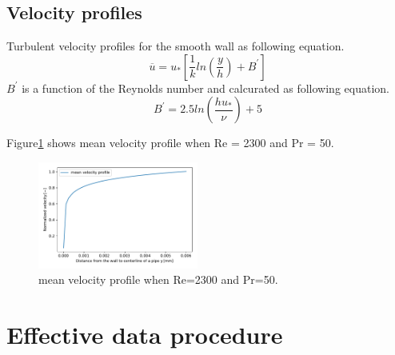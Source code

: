 \documentclass[conference]{IEEEtran}
\begin{document}
\subsection{Velocity profiles}
Turbulent velocity profiles for the smooth wall as following equation.
\begin{equation}
    \overline{u} = u_{*} \left[\frac{1}{k}ln\left(\frac{y}{h}\right)+B^{\prime}\right]
\end{equation}
$B^{\prime}$ is a function of the Reynolds number and calcurated as following equation.
\begin{equation}
    B^{\prime} = 2.5 ln\left(\frac{hu_{*}}{\nu}\right)+5
\end{equation}

Figure\ref{mean_velocity_profile} shows mean velocity profile when Re = 2300 and Pr = 50.
\begin{figure}[htbp]
  \centering
  \vspace{5zh}
  \includegraphics[width=0.47\textwidth, natwidth=400,natheight=200]{fig/velocity_profile.pdf}
  \vspace{-1zh}
  \caption{mean velocity profile when Re=2300 and Pr=50.}
  \label{mean_velocity_profile}
\end{figure}

\section{Effective data procedure}
\end{document}
